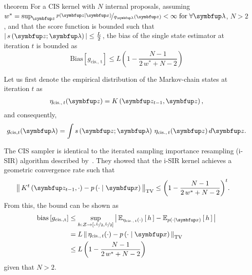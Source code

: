 
\begin{theoremEnd}{theorem}
  For a CIS kernel with \(N\) internal proposals,
  assuming \(w^* = \sup_{\vz} \nicefrac{p\left(\vz\mid\vx\right)}{q_{\vlambda}\left(\vz\right)} < \infty\; \text{for} \; \forall \vlambda \), \(N > 2\), and that the score function is bounded such that \(\left|\,s\left(\vz; \vlambda\right)\,\right| \leq \frac{L}{2}\), the bias of the single state estimator at iteration \(t\) is bounded as
  {\small
  \[
    \mathrm{Bias}\left[ g_{\mathrm{cis.,\, t}} \right] \leq L \left(1 - \frac{N - 1}{2\,w^* + N - 2}\right)
  \]
  }
\end{theoremEnd}
\begin{proofEnd}
  Let us first denote the empirical distribution of the Markov-chain states at iteration \(t\) as
  \begin{align}
    \eta_{\mathrm{cis.},\, t}(\vz) = K\left(\vz_{t-1}, \vz\right),
  \end{align}
  and consequently,
  \begin{align}
      g_{\mathrm{cis}, t}(\vlambda) = \int s\left(\vz; \vlambda\right) \, \eta_{\mathrm{cis.},\, t}(\vz) \, d\vz.
  \end{align}

  The CIS sampler is identical to the iterated sampling importance resampling (i-SIR) algorithm described by~\citet{andrieu_uniform_2018}.
  They showed that the i-SIR kernel achieves a geometric convergence rate such that
  \begin{align}
    \DTV{K^{t}\left(\vz_{t-1},\cdot\right)}{p\left(\cdot\mid\vx\right)}
    &\leq {\left(1 - \frac{N - 1}{2\,w^* + N - 2}\right)}^t.
  \end{align}
  From this, the bound can be shown as
  \begin{align}
    \mathrm{bias}\left[ g_{\mathrm{cis., t}} \right]
    &\leq \sup_{h : \mathcal{Z} \rightarrow \left[ \text{-}\nicefrac{L}{2}, \nicefrac{L}{2} \right]} \left|\, \Esub{\eta_{\mathrm{cis.},\, t}(\cdot)}{h} - \Esub{p(\cdot\mid\vx)}{h} \,\right| \\
    &= L \, \DTV{ \eta_{\mathrm{cis.},\, t}(\cdot) }{p\left(\cdot\mid\vx\right)}  \\
    &\leq L \, {\left(1 - \frac{N - 1}{2\,w^* + N - 2}\right)}
  \end{align}
  given that \(N > 2\).
\end{proofEnd}

